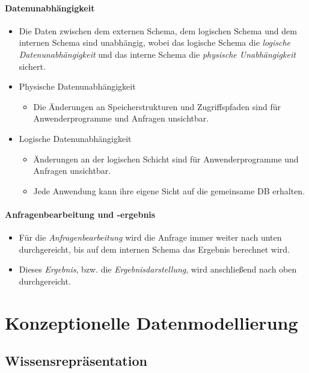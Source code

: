 			\subsubsection{Datenunabhängigkeit} %
				\begin{itemize}
					\item Die Daten zwischen dem externen Schema, dem logischen Schema und dem internen Schema sind unabhängig, wobei das logische Schema die \textit{logische Datenunabhängigkeit} und das interne Schema die \textit{physische Unabhängigkeit} sichert.
					\item Physische Datenunabhängigkeit
						\begin{itemize}
							\item Die Änderungen an Speicherstrukturen und Zugriffspfaden sind für Anwenderprogramme und Anfragen unsichtbar.
						\end{itemize}
					\item Logische Datenunabhängigkeit
						\begin{itemize}
							\item Änderungen an der logischen Schicht sind für Anwenderprogramme und Anfragen unsichtbar.
							\item Jede Anwendung kann ihre eigene Sicht auf die gemeinsame DB erhalten.
						\end{itemize}
				\end{itemize}

			\subsubsection{Anfragenbearbeitung und -ergebnis} %
				\begin{itemize}
					\item Für die \textit{Anfragenbearbeitung} wird die Anfrage immer weiter nach unten durchgereicht, bis auf dem internen Schema das Ergebnis berechnet wird.
					\item Dieses \textit{Ergebnis}, bzw. die \textit{Ergebnisdarstellung}, wird anschließend nach oben durchgereicht.
				\end{itemize}

\chapter{Konzeptionelle Datenmodellierung} %
	\label{c:conceptmodel}

	\section{Wissensrepräsentation} %
